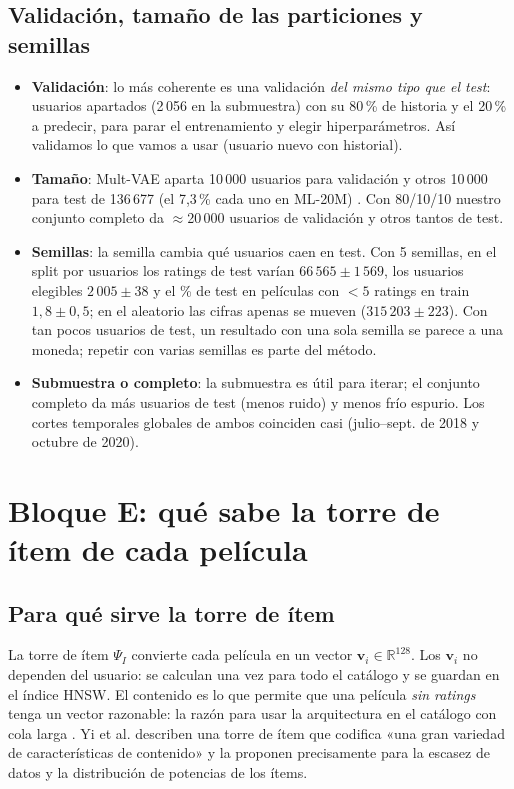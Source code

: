 \documentclass[a4paper,11pt]{article}
\begin{document}
\subsection{Validación, tamaño de las particiones y semillas}
\begin{itemize}
  \item \textbf{Validación}: lo más coherente es una validación \emph{del mismo tipo que el test}: usuarios apartados (2\,056
        en la submuestra) con su 80\,\% de historia y el 20\,\% a predecir, para parar el entrenamiento y elegir
        hiperparámetros. Así validamos lo que vamos a usar (usuario nuevo con historial).
  \item \textbf{Tamaño}: Mult-VAE aparta 10\,000 usuarios para validación y otros 10\,000 para test de 136\,677 (el 7,3\,\%
        cada uno en ML-20M) \cite{liang2018}. Con 80/10/10 nuestro conjunto completo da $\approx$20\,000 usuarios de validación
        y otros tantos de test.
  \item \textbf{Semillas}: la semilla cambia qué usuarios caen en test. Con 5 semillas, en el split por usuarios los ratings de
        test varían $66\,565\pm1\,569$, los usuarios elegibles $2\,005\pm38$ y el \% de test en películas con $<5$ ratings en train
        $1{,}8\pm0{,}5$; en el aleatorio las cifras apenas se mueven ($315\,203\pm223$). Con tan pocos usuarios de test, un resultado
        con una sola semilla se parece a una moneda; repetir con varias semillas es parte del método.
  \item \textbf{Submuestra o completo}: la submuestra es útil para iterar; el conjunto completo da más usuarios de test
        (menos ruido) y menos frío espurio. Los cortes temporales globales de ambos coinciden casi (julio--sept. de 2018 y
        octubre de 2020).
\end{itemize}

\section{Bloque E: qué sabe la torre de ítem de cada película}\label{sec:E}

\subsection{Para qué sirve la torre de ítem}
La torre de ítem $\Psi_I$ convierte cada película en un vector $\mathbf v_i\in\mathbb R^{128}$. Los $\mathbf v_i$ no
dependen del usuario: se calculan una vez para todo el catálogo y se guardan en el índice HNSW. El contenido es lo que
permite que una película \emph{sin ratings} tenga un vector razonable: la razón para usar la arquitectura en el catálogo con cola larga
\cite{yi2019}. Yi et al. describen una torre de ítem que codifica «una gran variedad de características de contenido» y
la proponen precisamente para la escasez de datos y la distribución de potencias de los ítems.
\end{document}
